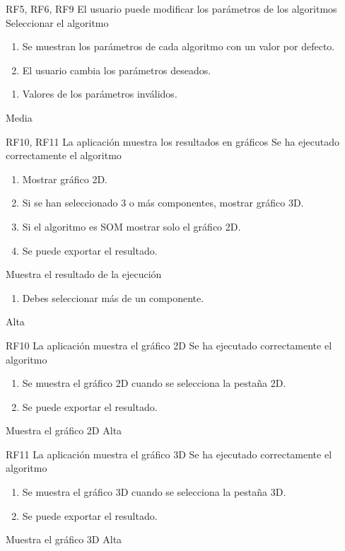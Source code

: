 {RF5, RF6, RF9}
{El usuario puede modificar los parámetros de los algoritmos}
{Seleccionar el algoritmo}
{
    \begin{enumerate}
        \def\labelenumi{\arabic{enumi}.}
        \tightlist
        \item Se muestran los parámetros de cada algoritmo con un valor por defecto.
        \item El usuario cambia los parámetros deseados.
    \end{enumerate}
}
{}
{
    \begin{enumerate}
        \def\labelenumi{\arabic{enumi}.}
        \tightlist
        \item Valores de los parámetros inválidos.
    \end{enumerate}
}
{Media}

{RF10, RF11}
{La aplicación muestra los resultados en gráficos}
{Se ha ejecutado correctamente el algoritmo}
{
    \begin{enumerate}
        \def\labelenumi{\arabic{enumi}.}
        \tightlist
        \item Mostrar gráfico 2D.
        \item Si se han seleccionado 3 o más componentes, mostrar gráfico 3D.
        \item Si el algoritmo es SOM mostrar solo el gráfico 2D.
        \item Se puede exportar el resultado.
    \end{enumerate}
}
{Muestra el resultado de la ejecución}
{
    \begin{enumerate}
        \def\labelenumi{\arabic{enumi}.}
        \tightlist
        \item Debes seleccionar más de un componente.
    \end{enumerate}
}
{Alta}

{RF10}
{La aplicación muestra el gráfico 2D}
{Se ha ejecutado correctamente el algoritmo}
{
    \begin{enumerate}
        \def\labelenumi{\arabic{enumi}.}
        \tightlist
        \item Se muestra el gráfico 2D cuando se selecciona la pestaña 2D.
        \item Se puede exportar el resultado.
    \end{enumerate}
}
{Muestra el gráfico 2D}
{}
{Alta}

{RF11}
{La aplicación muestra el gráfico 3D}
{Se ha ejecutado correctamente el algoritmo}
{
    \begin{enumerate}
        \def\labelenumi{\arabic{enumi}.}
        \tightlist
        \item Se muestra el gráfico 3D cuando se selecciona la pestaña 3D.
        \item Se puede exportar el resultado.
    \end{enumerate}
}
{Muestra el gráfico 3D}
{}
{Alta}

